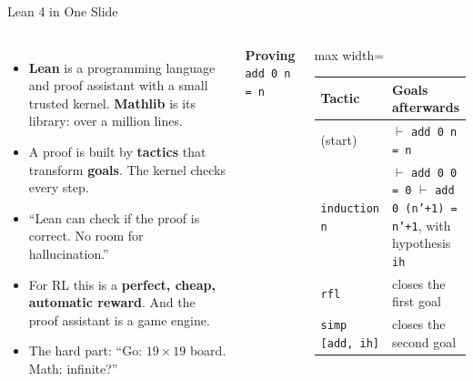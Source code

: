 \begin{frame}{Lean 4 in One Slide}
    \begin{columns}[T,onlytextwidth]
        \begin{itemize}\itemsep0.45em
            \item \textbf{Lean} is a programming language and proof assistant with a small trusted kernel. \textbf{Mathlib} is its library: over a million lines.
            \item A proof is built by \textbf{tactics} that transform \textbf{goals}. The kernel checks every step.
            \item ``Lean can check if the proof is correct. No room for hallucination.''
            \item For RL this is a \textbf{perfect, cheap, automatic reward}. And the proof assistant is a game engine.
            \item The hard part: ``Go: $19\times19$ board. Math: infinite?''
        \end{itemize}
        \small
        \textbf{Proving} \texttt{add 0 n = n}

        \vspace{0.3em}
        \begin{adjustbox}{max width=\linewidth}\begin{tabular}{>{\raggedright\arraybackslash}p{2.4cm}>{\raggedright\arraybackslash}p{3.9cm}}
            \toprule
            \textbf{Tactic} & \textbf{Goals afterwards} \\
            \midrule
            (start) & $\vdash$ \texttt{add 0 n = n} \\
            \texttt{induction n} & $\vdash$ \texttt{add 0 0 = 0} \newline $\vdash$ \texttt{add 0 (n'+1) = n'+1}, with hypothesis \texttt{ih} \\
            \texttt{rfl} & closes the first goal \\
            \texttt{simp [add, ih]} & closes the second goal \\
            \bottomrule
        \end{tabular}\end{adjustbox}

        \vspace{0.5em}
    \end{columns}
    \vspace{0.1em}
\end{frame}

